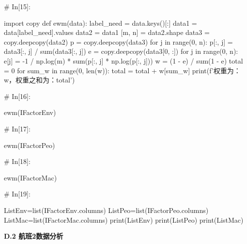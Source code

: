 \documentclass{MathorCupModeling}
\begin{document}
\begin{python}
# In[15]:


import copy
def ewm(data):
    label_need = data.keys()[:]
    data1 = data[label_need].values
    data2 = data1
    [m, n] = data2.shape
    data3 = copy.deepcopy(data2)
    p = copy.deepcopy(data3)
    for j in range(0, n):
        p[:, j] = data3[:, j] / sum(data3[:, j])
    e = copy.deepcopy(data3[0, :])
    for j in range(0, n):
        e[j] = -1 / np.log(m) * sum(p[:, j] * np.log(p[:, j]))
    w = (1 - e) / sum(1 - e)
    total = 0
    for sum_w in range(0, len(w)):
        total = total + w[sum_w]
    print(f'权重为：{w}，权重之和为：{total}')


# In[16]:


ewm(IFactorEnv)


# In[17]:


ewm(IFactorPeo)


# In[18]:


ewm(IFactorMac)


# In[19]:


ListEnv=list(IFactorEnv.columns)
ListPeo=list(IFactorPeo.columns)
ListMac=list(IFactorMac.columns)
print(ListEnv)
print(ListPeo)
print(ListMac)


\end{python}
\newpage
\textbf{D.2 航班2数据分析}
\end{document}
